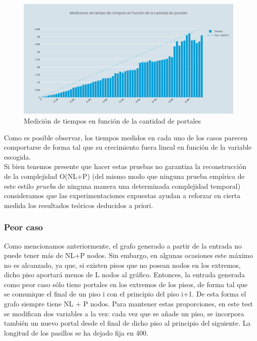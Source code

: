 \begin{figure}[h!]
   \begin{center}
 	\includegraphics[width=18cm]{imagenes/ej2/f(portales).png}
	\caption{Medición de tiempos en función de la cantidad de portales}
	\label{portales}
   \end{center}
 \end{figure}


Como es posible observar, los tiempos medidos en cada uno de los casos parecen comportarse de forma tal que su crecimiento fuera lineal en función de la variable escogida.\\

Si bien tenemos presente que hacer estas pruebas no garantiza la reconstrucción de la complejidad O(NL+P) (del mismo modo que ninguna prueba empírica de este estilo \textit{prueba} de ninguna manera una determinada complejidad temporal) consideramos que las experimentaciones expuestas ayudan a reforzar en cierta medida los resultados teóricos deducidos a priori. \\

\subsubsection{Peor caso}
Como mencionamos anteriormente, el grafo generado a partir de la entrada no puede tener más de NL+P nodos. Sin embargo, en algunas ocasiones este máximo no es alcanzado, ya que, si existen pisos que no posean nodos en los extremos, dicho piso aportará menos de L nodos al gráfico. Entonces, la entrada generada como peor caso sólo tiene portales en los extremos de los pisos, de forma tal que se comunique el final de un piso i con el principio del piso i+1. De esta forma el grafo siempre tiene NL + P nodos. Para mantener estas proporciones, en este test se modifican dos variables a la vez: cada vez que se añade un piso, se incorpora también un nuevo portal desde el final de dicho piso al principio del siguiente. La longitud de los pasillos se ha dejado fija en 400.

